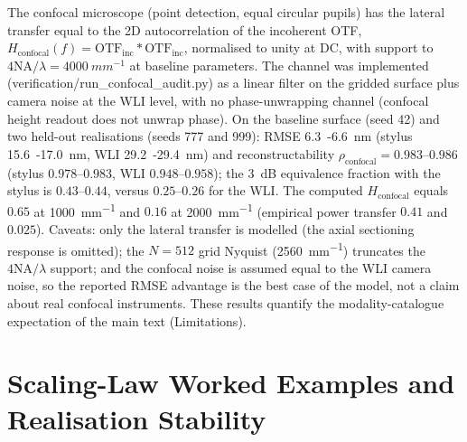 \documentclass[review,12pt]{elsarticle}
\begin{document}
The confocal microscope (point detection, equal circular pupils) has the lateral transfer equal to the 2D autocorrelation of the incoherent OTF, $H_\mathrm{confocal}(f) = \mathrm{OTF}_\mathrm{inc} \ast \mathrm{OTF}_\mathrm{inc}$, normalised to unity at DC, with support to $4\mathrm{NA}/\lambda = \SI{4000}{mm^{-1}}$ at baseline parameters. The channel was implemented (verification/run\_confocal\_audit.py) as a linear filter on the gridded surface plus camera noise at the WLI level, with no phase-unwrapping channel (confocal height readout does not unwrap phase). On the baseline surface (seed 42) and two held-out realisations (seeds 777 and 999): RMSE \SI{6.3}{-}\SI{6.6}{nm} (stylus \SI{15.6}{-}\SI{17.0}{nm}, WLI \SI{29.2}{-}\SI{29.4}{nm}) and reconstructability $\rho_\mathrm{confocal} = 0.983$--$0.986$ (stylus $0.978$--$0.983$, WLI $0.948$--$0.958$); the \SI{3}{dB} equivalence fraction with the stylus is $0.43$--$0.44$, versus $0.25$--$0.26$ for the WLI. The computed $H_\mathrm{confocal}$ equals $0.65$ at \SI{1000}{mm^{-1}} and $0.16$ at \SI{2000}{mm^{-1}} (empirical power transfer $0.41$ and $0.025$). Caveats: only the lateral transfer is modelled (the axial sectioning response is omitted); the $N=512$ grid Nyquist (\SI{2560}{mm^{-1}}) truncates the $4\mathrm{NA}/\lambda$ support; and the confocal noise is assumed equal to the WLI camera noise, so the reported RMSE advantage is the best case of the model, not a claim about real confocal instruments. These results quantify the modality-catalogue expectation of the main text (Limitations).

\section{Scaling-Law Worked Examples and Realisation Stability}
\label{S7}
\end{document}
